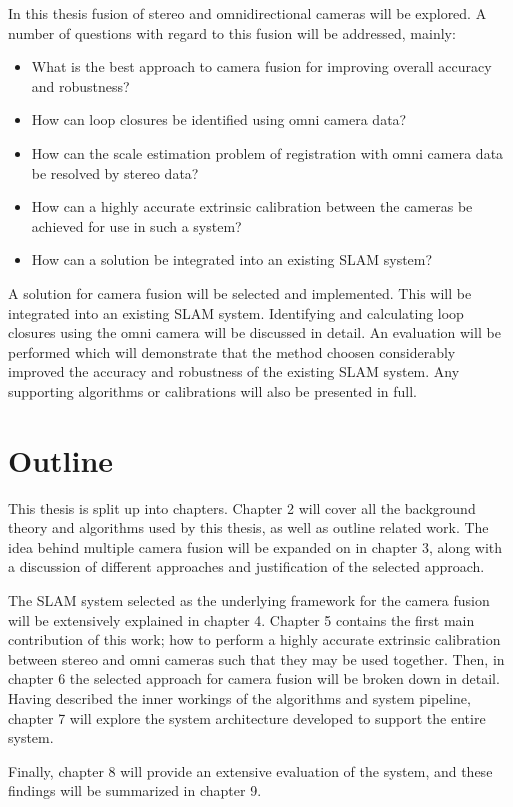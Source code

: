 In this thesis fusion of stereo and omnidirectional cameras will be explored.  A number of questions with regard to this fusion will be addressed, mainly:
\begin{itemize}
 \item What is the best approach to camera fusion for improving overall accuracy and robustness?
 \item How can loop closures be identified using omni camera data?
 \item How can the scale estimation problem of registration with omni camera data be resolved by stereo data?
 \item How can a highly accurate extrinsic calibration between the cameras be achieved for use in such a system?
 \item How can a solution be integrated into an existing SLAM system?
\end{itemize}

A solution for camera fusion will be selected and implemented.  This will be integrated into an existing SLAM system.  Identifying and calculating loop closures using the omni camera will be discussed in detail.  An evaluation will be performed which will demonstrate that the method choosen considerably improved the accuracy and robustness of the existing SLAM system.  Any supporting algorithms or calibrations will also be presented in full.

\section{Outline}

This thesis is split up into chapters.  Chapter 2 will cover all the background theory and  algorithms used by this thesis, as well as outline related work.  The idea behind multiple camera fusion will be expanded on in chapter 3, along with a discussion of different approaches and justification of the selected approach. 

The SLAM system selected as the underlying framework for the camera fusion will be extensively explained in chapter 4.  Chapter 5 contains the first main contribution of this work; how to perform a highly accurate extrinsic calibration between stereo and omni cameras such that they may be used together.  Then, in chapter 6 the selected approach for camera fusion will be broken down in detail.  Having described the inner workings of the algorithms and system pipeline, chapter 7 will explore the system architecture developed to support the entire system.

Finally, chapter 8 will provide an extensive evaluation of the system, and these findings will be summarized in chapter 9.